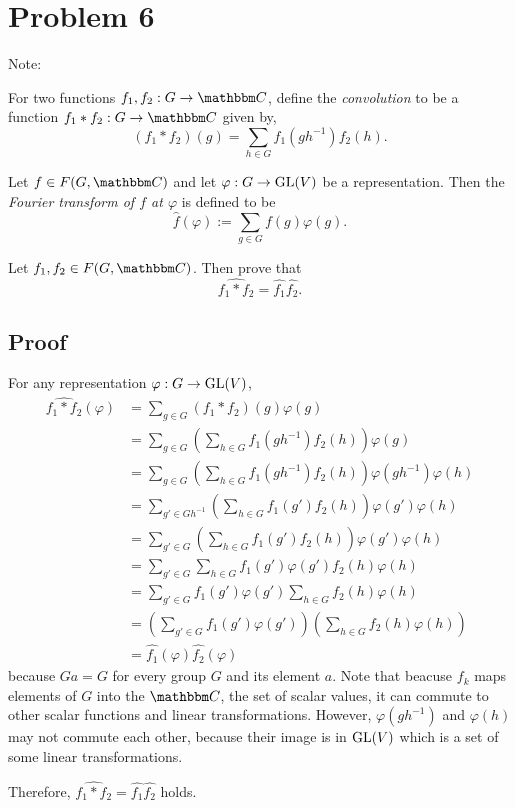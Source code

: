 \section*{Problem 6}

Note:
\begin{definition}
For two functions \(f_1, f_2: G \to \bbC\),
define the \emph{convolution} to be a function \(f_1 * f_2: G \to \bbC\)
given by,
\[(f_1 * f_2)(g) = \sum_{h \in G} f_1(gh^{-1})f_2(h).\]
\end{definition}

\begin{definition}
Let \(f \in F(G, \bbC)\) and let \(\varphi: G \to \textnormal{GL}(V)\) be a representation.
Then the \emph{Fourier transform of \(f\) at \(\varphi\)} is defined to be
\[\widehat{f}(\varphi) := \sum_{g \in G} f(g) \varphi(g).\]
\end{definition}

Let \(f_1, f_2 \in F(G, \bbC)\).
Then prove that
\[\widehat{f_1 * f_2} = \widehat{f_1} \widehat{f_2}.\]

\subsection*{Proof}

For any representation \(\varphi: G \to \textnormal{GL}(V)\),
\begin{align*}
  \widehat{f_1 * f_2}(\varphi)
  &= \sum_{g \in G} (f_1 * f_2)(g) \varphi(g)
  \\&= \sum_{g \in G} \left(\sum_{h \in G} f_1(gh^{-1}) f_2(h)\right) \varphi(g)
  \\&= \sum_{g \in G} \left(\sum_{h \in G} f_1(gh^{-1}) f_2(h)\right) \varphi(gh^{-1}) \varphi(h)
  \\&= \sum_{g' \in G h^{-1}} \left(\sum_{h \in G} f_1(g') f_2(h)\right) \varphi(g') \varphi(h)
  \\&= \sum_{g' \in G} \left(\sum_{h \in G} f_1(g') f_2(h)\right) \varphi(g') \varphi(h)
  \\&= \sum_{g' \in G} \sum_{h \in G} f_1(g') \varphi(g') f_2(h) \varphi(h)
  \\&= \sum_{g' \in G} f_1(g') \varphi(g') \sum_{h \in G} f_2(h) \varphi(h)
  \\&= \left(\sum_{g' \in G} f_1(g') \varphi(g') \right) \left( \sum_{h \in G} f_2(h) \varphi(h) \right)
  \\&= \widehat{f_1}(\varphi) \widehat{f_2}(\varphi)
\end{align*}
because \(Ga = G\) for every group \(G\) and its element \(a\).
Note that beacuse \(f_k\) maps elements of \(G\) into the \(\bbC\),
the set of scalar values,
it can commute to other scalar functions and linear transformations.
However, \(\varphi(gh^{-1})\) and \(\varphi(h)\) may not commute
each other, because their image is in \(\textnormal{GL}(V)\) which is a set of
some linear transformations.

Therefore, \(\widehat{f_1 * f_2} = \widehat{f_1} \widehat{f_2}\) holds.
\qedsq